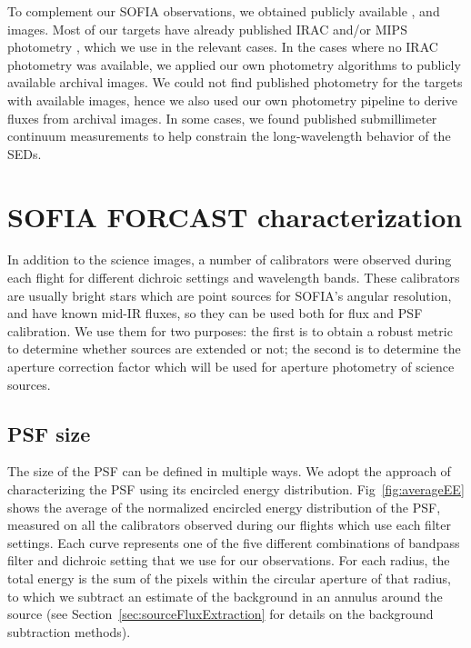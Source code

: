 To complement our SOFIA observations, we obtained publicly available \Spitzer, and \Herschel images. Most of our targets have already published \Spitzer IRAC and/or MIPS photometry \citep[mostly from][]{Gutermuth:2009gca,Megeath:2012cn,Evans:2009bka}, which we use in the relevant cases. In the cases where no IRAC photometry was available, we applied our own photometry algorithms to publicly available archival images. We could not find published photometry for the targets with available \Herschel images, hence we also used our own photometry pipeline to derive fluxes from archival images. In some cases, we found published submillimeter continuum measurements to help constrain the long-wavelength behavior of the SEDs.


\section{SOFIA FORCAST characterization}

In addition to the science images, a number of calibrators were observed during each flight for different dichroic settings and wavelength bands. These calibrators are usually bright stars which are point sources for SOFIA's angular resolution, and have known mid-IR fluxes, so they can be used both for flux and PSF calibration. We use them for two purposes: the first is to obtain a robust metric to determine whether sources are extended or not; the second is to determine the aperture correction factor which will be used for aperture photometry of science sources. 

\subsection{PSF size}
The size of the PSF can be defined in multiple ways. We adopt the approach of characterizing the PSF using its encircled energy distribution. Fig~\ref{fig:averageEE} shows the average of the normalized encircled energy distribution of the PSF, measured on all the calibrators observed during our flights which use each filter settings. Each curve represents one of the five different combinations of bandpass filter and dichroic setting that we use for our observations. For each radius, the total energy is the sum of the pixels within the circular aperture of that radius, to which we subtract an estimate of the background in an annulus around the source (see Section~\ref{sec:sourceFluxExtraction} for details on the background subtraction methods). 

